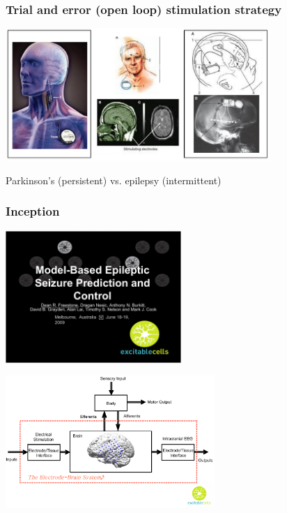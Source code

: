 \documentclass[compress]{beamer}
\begin{document}
\begin{frame}\frametitle{Trial and error (open loop) stimulation strategy}
	\begin{center}
		\includegraphics[height=5cm]{./Figures/EpilepsyStimulators.pdf} 
	\end{center}
	Parkinson's (persistent) vs. epilepsy (intermittent)	
\end{frame}

\begin{frame}\frametitle{Inception}
	\begin{center}
		\includegraphics[height=5cm]{./Figures/SparkTitle.pdf}	
	\end{center}	
\end{frame}

\begin{frame}
	\begin{center}
		\includegraphics[height=5cm]{./Figures/BodyBrainElectrodeSystem.pdf}	
	\end{center}	
\end{frame}
\end{document}
